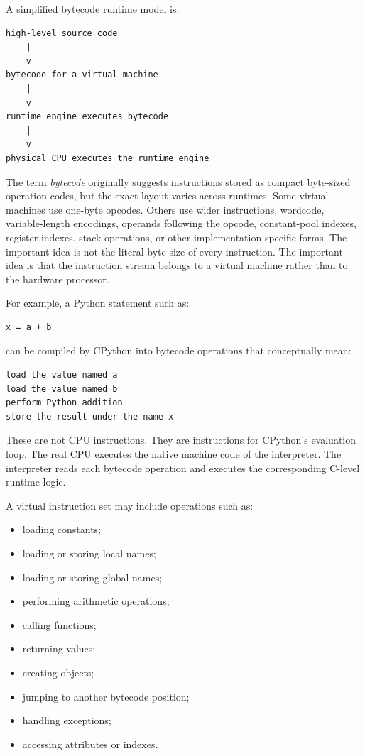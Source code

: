 \documentclass[a4paper,twoside]{report}
\begin{document}
A simplified bytecode runtime model is:

\begin{verbatim}
high-level source code
    |
    v
bytecode for a virtual machine
    |
    v
runtime engine executes bytecode
    |
    v
physical CPU executes the runtime engine
\end{verbatim}

The term \emph{bytecode} originally suggests instructions stored as compact byte-sized operation codes, but the exact layout varies across runtimes. Some virtual machines use one-byte opcodes. Others use wider instructions, wordcode, variable-length encodings, operands following the opcode, constant-pool indexes, register indexes, stack operations, or other implementation-specific forms. The important idea is not the literal byte size of every instruction. The important idea is that the instruction stream belongs to a virtual machine rather than to the hardware processor.

For example, a Python statement such as:

\begin{verbatim}
x = a + b
\end{verbatim}

can be compiled by CPython into bytecode operations that conceptually mean:

\begin{verbatim}
load the value named a
load the value named b
perform Python addition
store the result under the name x
\end{verbatim}

These are not CPU instructions. They are instructions for CPython's evaluation loop. The real CPU executes the native machine code of the interpreter. The interpreter reads each bytecode operation and executes the corresponding C-level runtime logic.

A virtual instruction set may include operations such as:

\begin{itemize}
    \item loading constants;
    \item loading or storing local names;
    \item loading or storing global names;
    \item performing arithmetic operations;
    \item calling functions;
    \item returning values;
    \item creating objects;
    \item jumping to another bytecode position;
    \item handling exceptions;
    \item accessing attributes or indexes.
\end{itemize}
\end{document}
